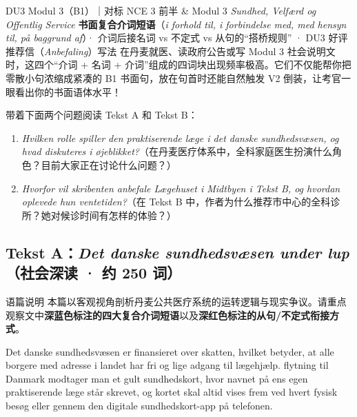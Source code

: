{DU3 Modul 3（B1）｜对标 NCE 3 前半 \& Modul 3 \textit{Sundhed, Velfærd og Offentlig Service}}
{\textbf{书面复合介词短语}（\textit{i forhold til, i forbindelse med, med hensyn til, på baggrund af}）· 介词后接名词 vs 不定式 vs 从句的“搭桥规则” · DU3 好评推荐信（\textit{Anbefaling}）写法}
{在丹麦就医、读政府公告或写 Modul 3 社会说明文时，这四个“介词 + 名词 + 介词”组成的四词块出现频率极高。它们不仅能帮你把零散小句浓缩成紧凑的 B1 书面句，放在句首时还能自然触发 V2 倒装，让考官一眼看出你的书面语体水平！}

\begin{foerduleaeser}
带着下面两个问题阅读 Tekst A 和 Tekst B：
\begin{enumerate}
  \item \textit{Hvilken rolle spiller den praktiserende læge i det danske sundhedsvæsen, og hvad diskuteres i øjeblikket?}（在丹麦医疗体系中，全科家庭医生扮演什么角色？目前大家正在讨论什么问题？）
  \item \textit{Hvorfor vil skribenten anbefale Lægehuset i Midtbyen i Tekst B, og hvordan oplevede hun ventetiden?}（在 Tekst B 中，作者为什么推荐市中心的全科诊所？她对候诊时间有怎样的体验？）
\end{enumerate}
\end{foerduleaeser}


\subsection*{Tekst A：\textit{Det danske sundhedsvæsen under lup}（社会深读 · 约 250 词）}

\begin{tipbox}{语篇说明}
本篇以客观视角剖析丹麦公共医疗系统的运转逻辑与现实争议。请重点观察文中\textbf{\color{NCDNavy}深蓝色标注的四大复合介词短语}以及\textbf{\color{NCDRed}深红色标注的从句/不定式衔接方式}。
\end{tipbox}

Det danske sundhedsvæsen er finansieret over skatten, hvilket betyder, at alle borgere med adresse i landet har fri og lige adgang til lægehjælp.  flytning til Danmark modtager man et gult sundhedskort, hvor navnet på ens egen praktiserende læge står skrevet, og kortet skal altid vises frem ved hvert fysisk besøg eller gennem den digitale sundhedskort-app på telefonen.

